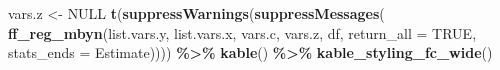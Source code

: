 \documentclass[
]{book}
\newenvironment{Shaded}{\begin{snugshade}}{\end{snugshade}}
\newcommand{\DataTypeTok}[1]{\textcolor[rgb]{0.13,0.29,0.53}{#1}}
\newcommand{\KeywordTok}[1]{\textcolor[rgb]{0.13,0.29,0.53}{\textbf{#1}}}
\newcommand{\NormalTok}[1]{#1}
\newcommand{\OperatorTok}[1]{\textcolor[rgb]{0.81,0.36,0.00}{\textbf{#1}}}
\newcommand{\OtherTok}[1]{\textcolor[rgb]{0.56,0.35,0.01}{#1}}
\newcommand{\StringTok}[1]{\textcolor[rgb]{0.31,0.60,0.02}{#1}}
\begin{document}
\begin{Shaded}
\begin{Highlighting}[]
\NormalTok{vars.z \textless{}{-}}\StringTok{ }\OtherTok{NULL}
\KeywordTok{t}\NormalTok{(}\KeywordTok{suppressWarnings}\NormalTok{(}\KeywordTok{suppressMessages}\NormalTok{(}
  \KeywordTok{ff\_reg\_mbyn}\NormalTok{(list.vars.y, list.vars.x,}
\NormalTok{            vars.c, vars.z, df,}
            \DataTypeTok{return\_all =} \OtherTok{TRUE}\NormalTok{,}
            \DataTypeTok{stats\_ends =} \StringTok{\textquotesingle{}Estimate\textquotesingle{}}\NormalTok{)))) }\OperatorTok{\%\textgreater{}\%}
\StringTok{  }\KeywordTok{kable}\NormalTok{() }\OperatorTok{\%\textgreater{}\%}
\StringTok{  }\KeywordTok{kable\_styling\_fc\_wide}\NormalTok{()}
\end{Highlighting}
\end{Shaded}
\end{document}
